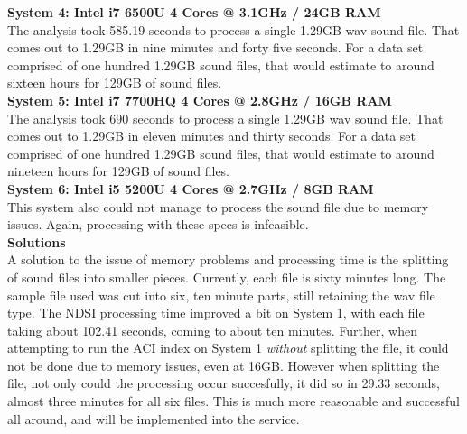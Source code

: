 \noindent\textbf{System 4: Intel i7 6500U 4 Cores @ 3.1GHz / 24GB RAM}\\
The analysis took 585.19 seconds to process a single 1.29GB wav sound file. That comes out to 1.29GB in nine minutes and forty five seconds. For a data set comprised of one hundred 1.29GB sound files, that would estimate to around sixteen hours for 129GB of sound files.\\

\noindent\textbf{System 5: Intel i7 7700HQ 4 Cores @ 2.8GHz / 16GB RAM}\\
The analysis took 690 seconds to process a single 1.29GB wav sound file. That comes out to 1.29GB in eleven minutes and thirty seconds. For a data set comprised of one hundred 1.29GB sound files, that would estimate to around nineteen hours for 129GB of sound files.\\

\noindent\textbf{System 6: Intel i5 5200U 4 Cores @ 2.7GHz / 8GB RAM}\\
This system also could not manage to process the sound file due to memory issues. Again, processing with these specs is infeasible.\\

\noindent\textbf{Solutions}\\
A solution to the issue of memory problems and processing time is the splitting of sound files into smaller pieces. Currently, each file is sixty minutes long. The sample file used was cut into six, ten minute parts, still retaining the wav file type. The NDSI processing time improved a bit on System 1, with each file taking  about 102.41 seconds, coming to about ten minutes. Further, when attempting to run the ACI index on System 1 \textit{without} splitting the file, it could not be done due to memory issues, even at 16GB. However when splitting the file, not only could the processing occur succesfully, it did so in 29.33 seconds, almost three minutes for all six files. This is much more reasonable and successful all around, and will be implemented into the service.\\

